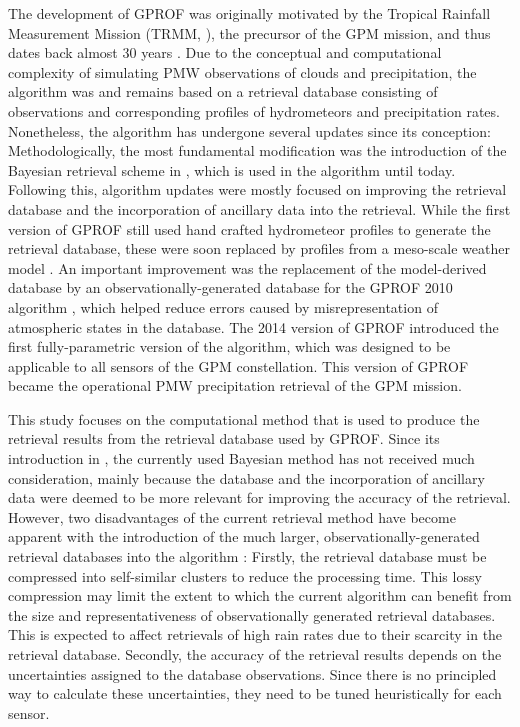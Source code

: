 \documentclass[journal abbreviation, manuscript]{copernicus}
\begin{document}
The development of GPROF was originally motivated by the Tropical Rainfall
Measurement Mission (TRMM, \citet{simpson96}), the precursor of the GPM mission,
and thus dates back almost 30 years \citep{kummerow94_a, kummerow94_b}. Due to
the conceptual and computational complexity of simulating PMW observations of
clouds and precipitation, the algorithm was and remains based on a retrieval
database consisting of  observations and corresponding
profiles of hydrometeors and precipitation rates. Nonetheless, the algorithm has
undergone several updates since its conception: Methodologically, the most
fundamental modification was the introduction of the Bayesian retrieval scheme
in \citet{kummerow96}, which is used in the algorithm until today. Following
this, algorithm updates were mostly focused on improving the retrieval database
and the incorporation of ancillary data into the retrieval. While the first
version of GPROF still used hand crafted hydrometeor profiles to generate the
retrieval database, these were soon replaced by profiles from a meso-scale
weather model \citep{kummerow96}. An important improvement was the replacement
of the model-derived database by an observationally-generated database for the
GPROF 2010 algorithm \citep{kummerow11, kummerow15}, which helped reduce errors
caused by misrepresentation of atmospheric states in the database. The 2014
version of GPROF \citep{kummerow15} introduced the first fully-parametric
version of the algorithm, which was designed to be applicable to all sensors of
the GPM constellation. This version of GPROF became the operational PMW
precipitation retrieval of the GPM mission.

This study focuses on the computational method that is used to produce the
retrieval results from the retrieval database used by GPROF. Since its
introduction in \citet{kummerow96}, the currently used Bayesian method has not
received much consideration, mainly because the database and the incorporation
of ancillary data were deemed to be more relevant for improving the accuracy of
the retrieval. However, two disadvantages of the current retrieval method have
become apparent with the introduction of the much larger,
observationally-generated retrieval databases into the algorithm
\citep{elsaesser15}: Firstly, the retrieval database must be compressed into
self-similar clusters to reduce the processing time. This lossy compression may
limit the extent to which the current algorithm can benefit from the size and
representativeness of observationally generated retrieval databases. This is
expected to  affect retrievals of high rain rates due to their
scarcity in the retrieval database. Secondly, the accuracy of the retrieval
results depends on the uncertainties assigned to the database observations.
Since there is no principled way to calculate these uncertainties, they need to
be tuned heuristically for each sensor.
\end{document}
